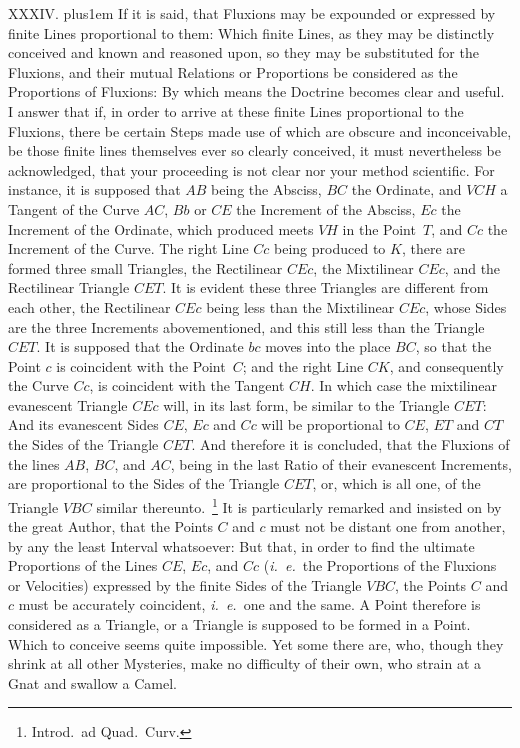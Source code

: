 XXXIV. \hskip 0pt plus1em
If it is said, that Fluxions may be expounded or expressed by
finite Lines proportional to them: Which finite Lines, as they
may be distinctly conceived and known and reasoned upon, so they
may be substituted for the Fluxions, and their mutual Relations
or Proportions be considered as the Proportions of Fluxions: By
which means the Doctrine becomes clear and useful.  I answer that
if, in order to arrive at these finite Lines proportional to the
Fluxions, there be certain Steps made use of which are obscure
and inconceivable, be those finite lines themselves ever so
clearly conceived, it must nevertheless be acknowledged, that
your proceeding is not clear nor your method scientific.
For instance, it is supposed that $AB$ being the Absciss, $BC$
the Ordinate, and $VCH$ a Tangent of the Curve $AC$, $Bb$ or $CE$
the Increment of the Absciss, $Ec$ the Increment of the Ordinate,
which produced meets $VH$ in the Point~$T$, and $Cc$ the
Increment of the Curve.  The right Line $Cc$ being produced to
$K$, there are formed three small Triangles, the Rectilinear
$CEc$, the Mixtilinear $CEc$, and the Rectilinear Triangle $CET$.
It is evident these three Triangles are different from each
other, the Rectilinear $CEc$ being less than the Mixtilinear
$CEc$, whose Sides are the three Increments abovementioned, and
this still less than the Triangle $CET$.  It is supposed that the
Ordinate $bc$ moves into the place $BC$, so that the Point $c$ is
coincident with the Point~$C$; and the right Line $CK$, and
consequently the Curve $Cc$, is coincident with the Tangent $CH$.
In which case the mixtilinear evanescent Triangle $CEc$ will, in
its last form, be similar to the Triangle $CET$: And its
evanescent Sides $CE$, $Ec$ and $Cc$ will be proportional to
$CE$, $ET$ and $CT$ the Sides of the Triangle $CET$.  And
therefore it is concluded, that the Fluxions of the lines $AB$,
$BC$, and $AC$, being in the last Ratio of their evanescent
Increments, are proportional to the Sides of the Triangle $CET$,
or, which is all one, of the Triangle $VBC$ similar
thereunto.~\footnote*{Introd.\ ad Quad.\ Curv.}
It is particularly remarked and insisted on by the great Author,
that the Points $C$ and $c$ must not be distant one from another,
by any the least Interval whatsoever: But that, in order to find
the ultimate Proportions of the Lines $CE$, $Ec$, and $Cc$
({\it i.~e.}\ the Proportions of the Fluxions or Velocities)
expressed by the finite Sides of the Triangle $VBC$, the Points
$C$ and $c$ must be accurately coincident, {\it i.~e.}\ one and
the same.  A Point therefore is considered as a Triangle, or a
Triangle is supposed to be formed in a Point.  Which to conceive
seems quite impossible.  Yet some there are, who, though they
shrink at all other Mysteries, make no difficulty of their own,
who strain at a Gnat and swallow a Camel.

